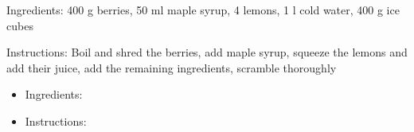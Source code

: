 Ingredients:
400 g berries, 50 ml maple syrup, 4 lemons, 1 l cold water, 400 g ice cubes

\noindent Instructions: Boil and shred the berries, add maple syrup, squeeze 
the lemons and add their juice, add the remaining ingredients, scramble 
thoroughly

\begin{itemize}
	\item Ingredients:

	\item Instructions:
\end{itemize}